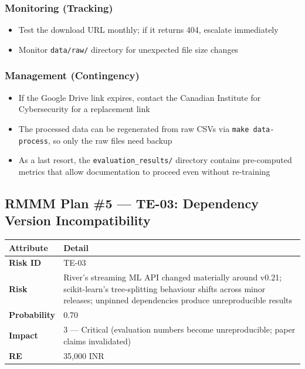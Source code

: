 \documentclass[11pt, a4paper]{article}
\newcommand{\col}[1]{\texttt{\small #1}}
\begin{document}
\subsubsection*{Monitoring (Tracking)}
\begin{itemize}[leftmargin=*]
    \item Test the download URL monthly; if it returns 404, escalate immediately
    \item Monitor \col{data/raw/} directory for unexpected file size changes
\end{itemize}

\subsubsection*{Management (Contingency)}
\begin{itemize}[leftmargin=*]
    \item If the Google Drive link expires, contact the Canadian Institute for Cybersecurity for a replacement link
    \item The processed data can be regenerated from raw CSVs via \col{make data-process}, so only the raw files need backup
    \item As a last resort, the \col{evaluation\_results/} directory contains pre-computed metrics that allow documentation to proceed even without re-training
\end{itemize}

\subsection{RMMM Plan \#5 --- TE-03: Dependency Version Incompatibility}

\begin{center}
\small
\begin{tabular}{|l|p{10cm}|}
\hline
\rowcolor{orange!10}
\textbf{Attribute} & \textbf{Detail} \\
\hline
\textbf{Risk ID} & TE-03 \\
\hline
\textbf{Risk} & River's streaming ML API changed materially around v0.21; scikit-learn's tree-splitting behaviour shifts across minor releases; unpinned dependencies produce unreproducible results \\
\hline
\textbf{Probability} & 0.70 \\
\hline
\textbf{Impact} & 3 --- Critical (evaluation numbers become unreproducible; paper claims invalidated) \\
\hline
\textbf{RE} & 35,000 INR \\
\hline
\end{tabular}
\normalsize
\end{center}
\end{document}

